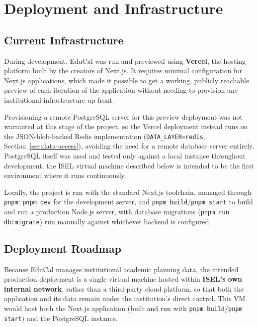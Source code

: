 %
%
\chapter{Deployment and Infrastructure} \label{cap:deployment}

\section{Current Infrastructure} \label{sec:current-infra}

During development, EduCal was run and previewed using \textbf{Vercel}, the hosting platform built by the creators of Next.js. It requires minimal configuration for Next.js applications, which made it possible to get a working, publicly reachable preview of each iteration of the application without needing to provision any institutional infrastructure up front.

Provisioning a remote PostgreSQL server for this preview deployment was not warranted at this stage of the project, so the Vercel deployment instead runs on the JSON-blob-backed Redis implementation (\texttt{DATA\_LAYER=redis}, Section~\ref{sec:data-access}), avoiding the need for a remote database server entirely. PostgreSQL itself was used and tested only against a local instance throughout development; the ISEL virtual machine described below is intended to be the first environment where it runs continuously.

Locally, the project is run with the standard Next.js toolchain, managed through \texttt{pnpm}: \texttt{pnpm dev} for the development server, and \texttt{pnpm build}/\texttt{pnpm start} to build and run a production Node.js server, with database migrations (\texttt{pnpm run db:migrate}) run manually against whichever backend is configured.

\section{Deployment Roadmap} \label{sec:deployment-roadmap}

Because EduCal manages institutional academic planning data, the intended production deployment is a single virtual machine hosted within \textbf{ISEL's own internal network}, rather than a third-party cloud platform, so that both the application and its data remain under the institution's direct control. This VM would host both the Next.js application (built and run with \texttt{pnpm build}/\texttt{pnpm start}) and the PostgreSQL instance.

